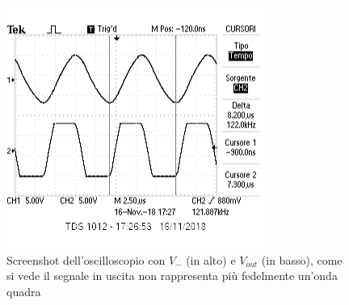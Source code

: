 \documentclass{article}
\begin{document}
			\begin{figure}
			\centering
			\includegraphics{immagini/Limite_frequenza.png}
		
			\caption{Screenshot dell'oscilloscopio con $V_-$ (in alto) e $V_{out}$ (in basso), come si vede il segnale in uscita non rappresenta più fedelmente un'onda quadra}
				\label{Limfreq}
		\end{figure}
	
\end{document}
